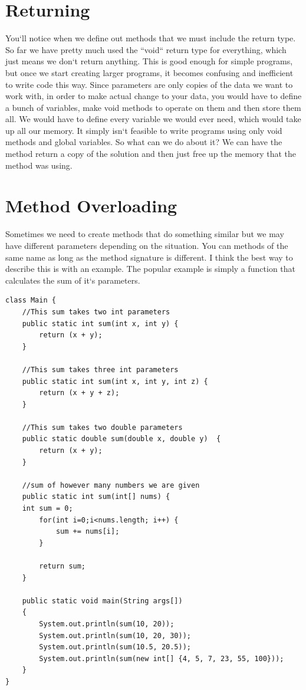 \documentclass[11]{article}
\begin{document}
\section{Returning}
You`ll notice when we define out methods that we must include the return type. So far we have pretty much used the ``void`` return type for everything, which just means we don`t return anything. This is good enough for simple programs, but once we start creating larger programs, it becomes confusing and inefficient to write code this way. Since parameters are only copies of the data we want to work with, in order to make actual change to your data, you would have to define a bunch of variables, make void methods to operate on them and then store them all. We would have to define every variable we would ever need, which would take up all our memory. It simply isn`t feasible to write programs using only void methods and global variables. So what can we do about it? We can have the method return a copy of the solution and then just free up the memory that the method was using.\\

\section{Method Overloading}
Sometimes we need to create methods that do something similar but we may have different parameters depending on the situation. You can methods of the same name as long as the method signature is different. I think the best way to describe this is with an example. The popular example is simply a function that calculates the sum of it`s parameters.

\begin{lstlisting}
class Main {
    //This sum takes two int parameters 
    public static int sum(int x, int y) { 
        return (x + y); 
    } 
  
    //This sum takes three int parameters 
    public static int sum(int x, int y, int z) { 
        return (x + y + z); 
    } 
  
    //This sum takes two double parameters 
    public static double sum(double x, double y)  { 
        return (x + y); 
    } 
    
    //sum of however many numbers we are given
    public static int sum(int[] nums) {
    int sum = 0;
    	for(int i=0;i<nums.length; i++) {
    		sum += nums[i];
    	}
    	
    	return sum;
    }
  
    public static void main(String args[]) 
    { 
        System.out.println(sum(10, 20)); 
        System.out.println(sum(10, 20, 30)); 
        System.out.println(sum(10.5, 20.5)); 
        System.out.println(sum(new int[] {4, 5, 7, 23, 55, 100}));
    } 
}
\end{lstlisting}
\end{document}
